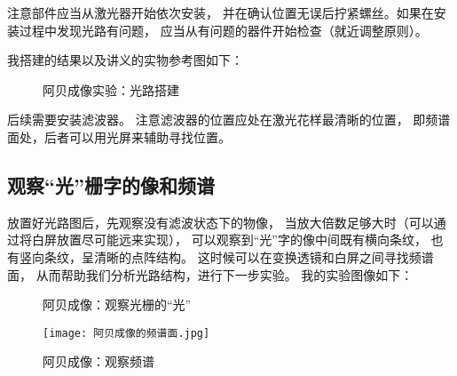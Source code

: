 \documentclass[11pt]{article}
\begin{document}
注意部件应当从激光器开始依次安装，
并在确认位置无误后拧紧螺丝。如果在安装过程中发现光路有问题，
应当从有问题的器件开始检查（就近调整原则）。

我搭建的结果以及讲义的实物参考图如下：
\begin{figure}[H]
    \centering
    \hspace{0.3in}
    \caption{阿贝成像实验：光路搭建}
\end{figure}

后续需要安装滤波器。
注意滤波器的位置应处在激光花样最清晰的位置，
即频谱面处，后者可以用光屏来辅助寻找位置。



\subsection{观察“光”栅字的像和频谱}

放置好光路图后，先观察没有滤波状态下的物像，
当放大倍数足够大时（可以通过将白屏放置尽可能远来实现），
可以观察到“光”字的像中间既有横向条纹，
也有竖向条纹，呈清晰的点阵结构。
这时候可以在变换透镜和白屏之间寻找频谱面，
从而帮助我们分析光路结构，进行下一步实验。
我的实验图像如下：

\begin{figure}[H]
    \centering
    \hspace{0.5cm}
    \caption{阿贝成像：观察光栅的“光”}
\end{figure}

\begin{figure}[H]
    \centering
    \texttt{[image: 阿贝成像的频谱面.jpg]}
    \caption{阿贝成像：观察频谱}
\end{figure}
\end{document}
